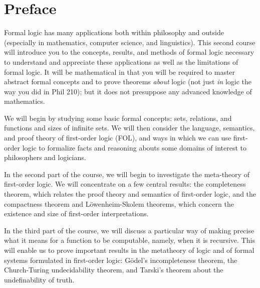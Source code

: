 \chapter{Preface}

Formal logic has many applications both within philosophy and outside
(especially in mathematics, computer science, and linguistics). This
second course will introduce you to the concepts, results, and methods
of formal logic necessary to understand and appreciate these
applications as well as the limitations of formal logic.  It will be 
mathematical in that you will be required to master abstract formal
concepts and to prove theorems \emph{about} logic (not just \emph{in}
logic the way you did in Phil 210); but it does not presuppose any
advanced knowledge of mathematics.

We will begin by studying some basic formal concepts: sets, relations,
and functions and sizes of infinite sets.  We will then consider the
language, semantics, and proof theory of first-order logic (FOL), and ways
in which we can use first-order logic to formalize facts and reasoning
abouts some domains of interest to philosophers and logicians.

In the second part of the course, we will begin to investigate the
meta-theory of first-order logic.  We will concentrate on a few
central results: the completeness theorem, which relates the proof
theory and semantics of first-order logic, and the compactness theorem
and L\"owenheim-Skolem theorems, which concern the existence and size
of first-order interpretations.

In the third part of the course, we will discuss a particular way of
making precise what it means for a function to be computable, namely,
when it is recursive.  This will enable us to prove important results
in the metatheory of logic and of formal systems formulated in
first-order logic: G\"odel's incompleteness theorem, the Church-Turing
undecidability theorem, and Tarski's theorem about the undefinability
of truth.
 
